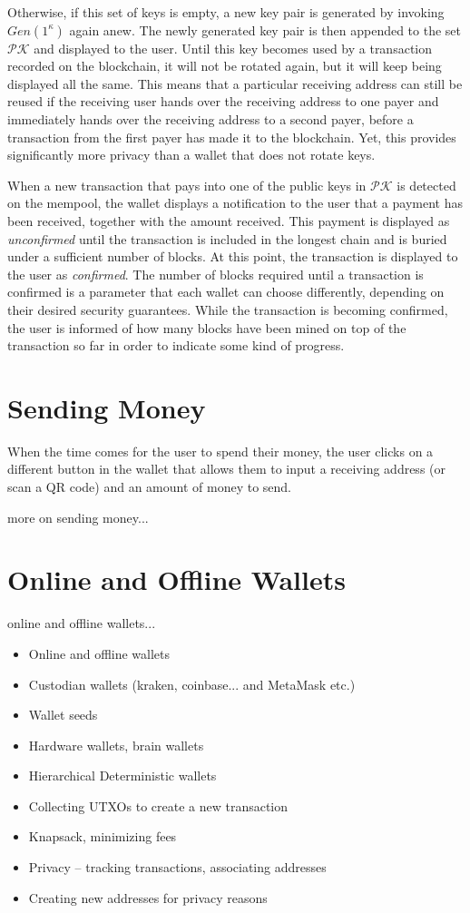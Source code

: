 Otherwise, if this set of keys is empty, a new key pair is generated by invoking $Gen(1^\kappa)$ again anew.
The newly generated key pair is then
appended to the set $\mathcal{PK}$ and displayed to the user. Until this key becomes used by a transaction recorded
on the blockchain, it will not be rotated again, but it will keep being displayed all the same. This means that
a particular receiving address can still be reused if the receiving user hands over the receiving address to one
payer and immediately hands over the receiving address to a second payer, before a transaction from the first payer
has made it to the blockchain. Yet, this provides significantly more privacy than a wallet that does not rotate
keys.

When a new transaction that pays into one of the public keys in $\mathcal{PK}$ is detected on the mempool, the
wallet displays a notification to the user that a payment has been received, together with the amount received.
This payment is displayed as \emph{unconfirmed} until the transaction is included in the longest chain and is
buried under a sufficient number of blocks. At this point, the transaction is displayed to the user as \emph{confirmed}.
The number of blocks required until a transaction is confirmed is a parameter that each wallet can choose differently,
depending on their desired security guarantees. While the transaction is becoming confirmed, the user is informed
of how many blocks have been mined on top of the transaction so far in order to indicate some kind of progress.

\section{Sending Money}

When the time comes for the user to spend their money, the user clicks on a different button in the wallet that
allows them to input a receiving address (or scan a QR code) and an amount of money to send.

{\color{red} more on sending money... }

\section{Online and Offline Wallets}

{\color{red} online and offline wallets...}

{\color{red}
\begin{itemize}
\item Online and offline wallets
\item Custodian wallets (kraken, coinbase... and MetaMask etc.)
\item Wallet seeds
\item Hardware wallets, brain wallets
\item Hierarchical Deterministic wallets
\item Collecting UTXOs to create a new transaction
\item Knapsack, minimizing fees
\item Privacy -- tracking transactions, associating addresses
\item Creating new addresses for privacy reasons
\end{itemize}
}
